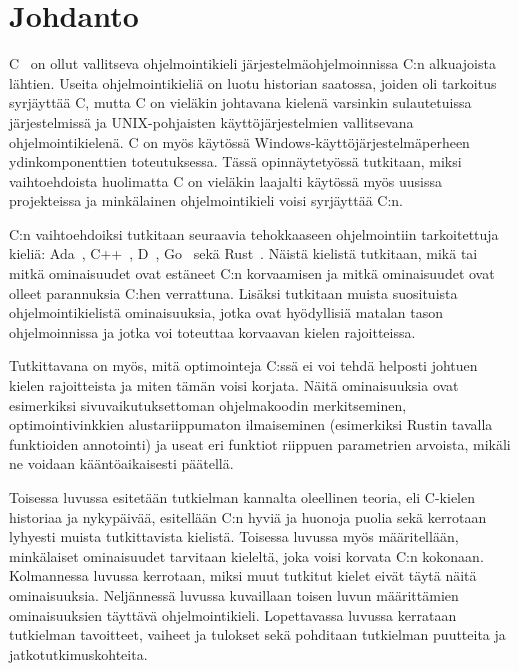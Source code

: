 \section{Johdanto} 

C~\citep{C11} on ollut vallitseva ohjelmointikieli järjestelmäohjelmoinnissa C:n
alkuajoista lähtien. Useita ohjelmointikieliä on luotu historian saatossa,
joiden oli tarkoitus syrjäyttää C, mutta C on vieläkin johtavana kielenä
varsinkin sulautetuissa järjestelmissä ja UNIX-pohjaisten käyttöjärjestelmien
vallitsevana ohjelmointikielenä. C on myös käytössä
Windows-käyttöjärjestelmäperheen ydinkomponenttien toteutuksessa. Tässä
opinnäytetyössä tutkitaan, miksi vaihtoehdoista huolimatta C on vieläkin
laajalti käytössä myös uusissa projekteissa ja minkälainen ohjelmointikieli
voisi syrjäyttää C:n.

C:n vaihtoehdoiksi tutkitaan seuraavia tehokkaaseen ohjelmointiin tarkoitettuja kieliä: Ada~\citep{ADA12},
C++~\citep{CPP14}, D~\citep{D}, Go~\citep{golang} sekä Rust~\citep{rust}.
Näistä kielistä tutkitaan, mikä tai mitkä ominaisuudet ovat estäneet C:n
korvaamisen ja mitkä ominaisuudet ovat olleet parannuksia C:hen verrattuna.
Lisäksi tutkitaan muista suosituista ohjelmointikielistä ominaisuuksia, jotka
ovat hyödyllisiä matalan tason ohjelmoinnissa ja jotka voi toteuttaa korvaavan
kielen rajoitteissa.

Tutkittavana on myös, mitä optimointeja C:ssä ei voi tehdä helposti johtuen
kielen rajoitteista ja miten tämän voisi korjata. Näitä ominaisuuksia ovat
esimerkiksi sivuvaikutuksettoman ohjelmakoodin merkitseminen,
optimointivinkkien alustariippumaton ilmaiseminen (esimerkiksi Rustin tavalla
funktioiden annotointi) ja useat eri funktiot riippuen parametrien arvoista,
mikäli ne voidaan kääntöaikaisesti päätellä.


Toisessa luvussa esitetään tutkielman kannalta oleellinen teoria, eli
C-kielen historiaa ja nykypäivää, esitellään C:n hyviä ja huonoja puolia sekä
kerrotaan lyhyesti muista tutkittavista kielistä.
Toisessa luvussa myös määritellään, minkälaiset ominaisuudet tarvitaan
kieleltä, joka voisi korvata C:n kokonaan.
Kolmannessa luvussa kerrotaan, miksi muut tutkitut kielet eivät täytä näitä
ominaisuuksia.
Neljännessä luvussa kuvaillaan toisen luvun määrittämien  ominaisuuksien
täyttävä ohjelmointikieli.
Lopettavassa luvussa kerrataan tutkielman tavoitteet, vaiheet ja tulokset
sekä pohditaan tutkielman puutteita ja jatkotutkimuskohteita.
